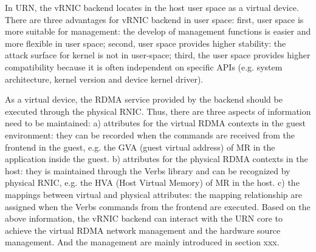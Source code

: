  In URN, the vRNIC backend locates in the host user space as a virtual device. There are three advantages for vRNIC backend in user space: first, user space is more suitable for management: the develop of management functions is easier and more flexible in user space; second, user space provides higher stability: the attack surface for kernel is not in user-space; third, the user space provides higher compatibility because it is often independent on specific APIs (e.g. system architecture, kernel version and device kernel driver).

As a virtual device, the RDMA service provided by the backend should be executed through the physical RNIC. Thus, there are three aspects of information need to be maintained: 
a) attributes for the virtual RDMA contexts in the guest environment: they can be recorded when the commands are received from the frontend in the guest, e.g. the GVA (guest virtual address) of MR in the application inside the guest.
b) attributes for the physical RDMA contexts in the host: they is maintained through the Verbs library and can be recognized by physical RNIC, e.g. the HVA (Host Virtual Memory) of MR in the host.
c) the mappings between virtual and physical attributes: the mapping relationship are assigned when the Verbs commands from the frontend are executed. 
Based on the above information, the vRNIC backend can interact with the URN core to achieve the virtual RDMA network management and the hardware source management. And the management are mainly introduced in section xxx.

